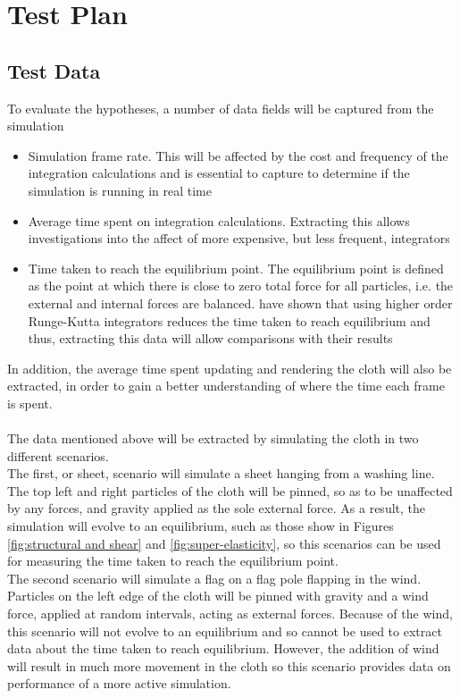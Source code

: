\chapter{Test Plan}

\section{Test Data}
To evaluate the hypotheses, a number of data fields will be captured from the simulation
\begin{itemize}
\item{Simulation frame rate. This will be affected by the cost and frequency of the integration calculations and is essential to capture to determine if the simulation is running in real time}
\item{Average time spent on integration calculations. Extracting this allows investigations into the affect of more expensive, but less frequent, integrators}
\item{Time taken to reach the equilibrium point. The equilibrium point is defined as the point at which there is close to zero total force for all particles, i.e. the external and internal forces are balanced. \textcite{Wang2009a} have shown that using higher order Runge-Kutta integrators reduces the time taken to reach equilibrium and thus, extracting this data will allow comparisons with their results}
\end{itemize}
In addition, the average time spent updating and rendering the cloth will also be extracted, in order to gain a better understanding of where the time each frame is spent.
\\\\The data mentioned above will be extracted by simulating the cloth in two different scenarios.
\\The first, or sheet, scenario will simulate a sheet hanging from a washing line. The top left and right particles of the cloth will be pinned, so as to be unaffected by any forces, and gravity applied as the sole external force. As a result, the simulation will evolve to an equilibrium, such as those show in Figures \ref{fig:structural and shear} and \ref{fig:super-elasticity}, so this scenarios can be used for measuring the time taken to reach the equilibrium point. 
\\The second scenario will simulate a flag on a flag pole flapping in the wind. Particles on the left edge of the cloth will be pinned with gravity and a wind force, applied at random intervals, acting as external forces. Because of the wind, this scenario will not evolve to an equilibrium and so cannot be used to extract data about the time taken to reach equilibrium. However, the addition of wind will result in much more movement in the cloth so this scenario provides data on performance of a more active simulation.

